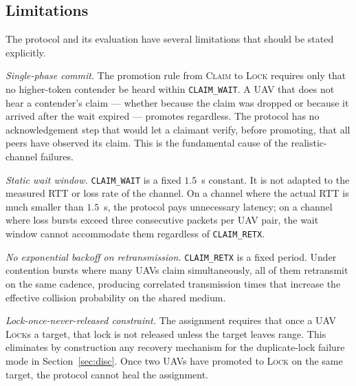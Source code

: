 \documentclass[11pt,letterpaper]{article}
\begin{document}
\subsection{Limitations}
\label{sec:lim}

The protocol and its evaluation have several limitations that should
be stated explicitly.

\textit{Single-phase commit.} The promotion rule from \textsc{Claim}
to \textsc{Lock} requires only that no higher-token contender be heard
within \texttt{CLAIM\_WAIT}. A UAV that does not hear a contender's
claim --- whether because the claim was dropped or because it arrived
after the wait expired --- promotes regardless. The protocol has no
acknowledgement step that would let a claimant verify, before
promoting, that all peers have observed its claim. This is the
fundamental cause of the realistic-channel failures.

\textit{Static wait window.} \texttt{CLAIM\_WAIT} is a fixed $1.5$~s
constant. It is not adapted to the measured RTT or loss rate of the
channel. On a channel where the actual RTT is much smaller than
$1.5$~s, the protocol pays unnecessary latency; on a channel where
loss bursts exceed three consecutive packets per UAV pair, the wait
window cannot accommodate them regardless of \texttt{CLAIM\_RETX}.

\textit{No exponential backoff on retransmission.}
\texttt{CLAIM\_RETX} is a fixed period. Under contention bursts where
many UAVs claim simultaneously, all of them retransmit on the same
cadence, producing correlated transmission times that increase the
effective collision probability on the shared medium.

\textit{Lock-once-never-released constraint.} The assignment requires
that once a UAV \textsc{Lock}s a target, that lock is not released
unless the target leaves range. This eliminates by construction any
recovery mechanism for the duplicate-lock failure mode in
Section~\ref{sec:disc}. Once two UAVs have promoted to \textsc{Lock}
on the same target, the protocol cannot heal the assignment.


\end{document}

